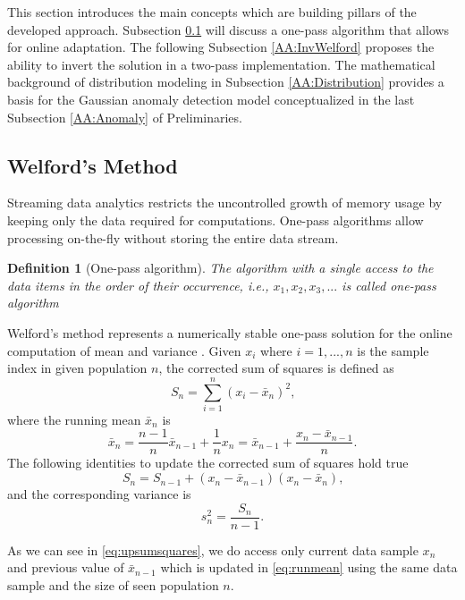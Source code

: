 This section introduces the main concepts which are building pillars of the developed approach. Subsection \ref{AA:Welford} will discuss a one-pass algorithm that allows for online adaptation. The following Subsection \ref{AA:InvWelford} proposes the ability to invert the solution in a two-pass implementation. The mathematical background of distribution modeling in Subsection \ref{AA:Distribution} provides a basis for the Gaussian anomaly detection model conceptualized in the last Subsection \ref{AA:Anomaly} of Preliminaries.

\subsection{Welford's Method}\label{AA:Welford}
Streaming data analytics restricts the uncontrolled growth of memory usage by keeping only the data required for computations. One-pass algorithms allow processing on-the-fly without storing the entire data stream.
\newtheorem{definition}{Definition}[section]
\begin{definition}[One-pass algorithm]
The algorithm with a single access to the data items in the order of their occurrence, i.e., \(x_1,x_2,x_3,...\) is called one-pass algorithm \cite{Schw09}
\end{definition}

Welford's method represents a numerically stable one-pass solution for the online computation of mean and variance \cite{Wel62}. 
Given \(x_i\) where \(i=1,...,n\) is the sample index in given population  \(n\), the corrected sum of squares is defined as
\begin{equation}
S_n = \sum_{i=1}^n (x_i - \bar x_n)^2\text{,}\label{eq:sumsquares}
\end{equation}
where the running mean \(\bar x_n\) is
\begin{equation}
\bar x_n = \frac{n-1}{n} \bar x_{n-1} + \frac{1}{n}x_n = \bar x_{n-1} + \frac{x_n - \bar x_{n-1}}{n}\text{.}\label{eq:runmean}
\end{equation}
The following identities to update the corrected sum of squares hold true
\begin{equation}
S_n = S_{n-1} + (x_n - \bar x_{n-1})(x_n - \bar x_n)\text{,}\label{eq:upsumsquares}
\end{equation}
and the corresponding variance is
\begin{equation}
s^2_n = \frac{S_{n}}{n-1}\text{.}\label{eq:runvar}
\end{equation}

As we can see in \eqref{eq:upsumsquares}, we do access only current data sample \(x_n\) and previous value of \(\bar x_{n-1}\) which is updated in \eqref{eq:runmean} using the same data sample and the size of seen population \(n\).

